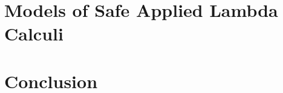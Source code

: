 \documentclass[a4paper,twoside,openright,draft]{ociamthesis}
\newif\ifdraftmode\draftmodefalse
\begin{document}
\chapter{Models of Safe Applied Lambda Calculi}
    \label{chap:model}
    
\ifdraftmode\else

\chapter{Conclusion}
    \label{chap:conclusion}
    



\fi


\pdfsyncstop
  
  

  \printnotations

  \printindex
\pdfsyncstart

     {\protect{}}
\end{document}
